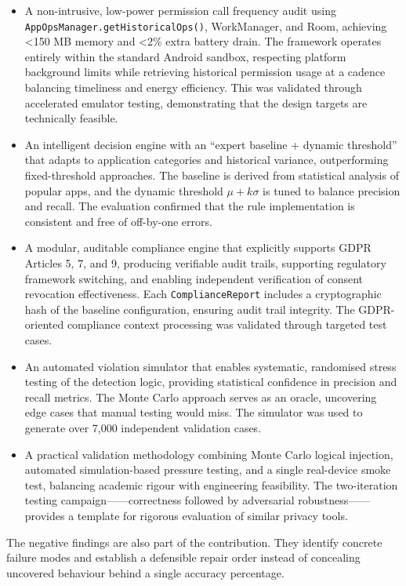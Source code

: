 \begin{itemize}
    \item A non-intrusive, low-power permission call frequency audit using \texttt{AppOpsManager.getHistoricalOps()}, WorkManager, and Room, achieving <150 MB memory and <2\% extra battery drain. The framework operates entirely within the standard Android sandbox, respecting platform background limits while retrieving historical permission usage at a cadence balancing timeliness and energy efficiency. This was validated through accelerated emulator testing, demonstrating that the design targets are technically feasible.
    \item An intelligent decision engine with an ``expert baseline + dynamic threshold'' that adapts to application categories and historical variance, outperforming fixed-threshold approaches. The baseline is derived from statistical analysis of popular apps, and the dynamic threshold $\mu + k\sigma$ is tuned to balance precision and recall. The evaluation confirmed that the rule implementation is consistent and free of off-by-one errors.
    \item A modular, auditable compliance engine that explicitly supports GDPR Articles 5, 7, and 9, producing verifiable audit trails, supporting regulatory framework switching, and enabling independent verification of consent revocation effectiveness. Each \texttt{ComplianceReport} includes a cryptographic hash of the baseline configuration, ensuring audit trail integrity. The GDPR-oriented compliance context processing was validated through targeted test cases.
    \item An automated violation simulator that enables systematic, randomised stress testing of the detection logic, providing statistical confidence in precision and recall metrics. The Monte Carlo approach serves as an oracle, uncovering edge cases that manual testing would miss. The simulator was used to generate over 7,000 independent validation cases.
    \item A practical validation methodology combining Monte Carlo logical injection, automated simulation-based pressure testing, and a single real-device smoke test, balancing academic rigour with engineering feasibility. The two-iteration testing campaign——correctness followed by adversarial robustness——provides a template for rigorous evaluation of similar privacy tools.
\end{itemize}

The negative findings are also part of the contribution. They identify concrete failure modes and establish a defensible repair order instead of concealing uncovered behaviour behind a single accuracy percentage.

